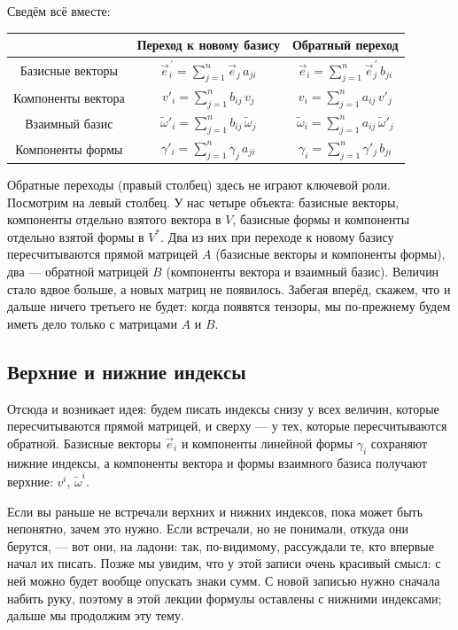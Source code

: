 \documentclass[11pt,a4paper]{article}
\begin{document}
Сведём всё вместе:

\begin{center}
\begin{tabular}{|c|c|c|}
\hline
 & Переход к новому базису & Обратный переход \\ \hline
Базисные векторы & $\vec e^{\,\prime}_i = \sum_{j=1}^n \vec e_j\, a_{ji}$ & $\vec e_i = \sum_{j=1}^n \vec e^{\,\prime}_j\, b_{ji}$ \\ \hline
Компоненты вектора & $v'_i = \sum_{j=1}^n b_{ij}\, v_j$ & $v_i = \sum_{j=1}^n a_{ij}\, v'_j$ \\ \hline
Взаимный базис & $\tilde\omega'_i = \sum_{j=1}^n b_{ij}\, \tilde\omega_j$ & $\tilde\omega_i = \sum_{j=1}^n a_{ij}\, \tilde\omega'_j$ \\ \hline
Компоненты формы & $\gamma'_i = \sum_{j=1}^n \gamma_j\, a_{ji}$ & $\gamma_i = \sum_{j=1}^n \gamma'_j\, b_{ji}$ \\ \hline
\end{tabular}
\end{center}

Обратные переходы (правый столбец) здесь не играют ключевой роли. Посмотрим на левый столбец. У нас четыре объекта: базисные векторы, компоненты отдельно взятого вектора в $V$, базисные формы и компоненты отдельно взятой формы в $V^*$. Два из них при переходе к новому базису пересчитываются прямой матрицей $A$ (базисные векторы и компоненты формы), два — обратной матрицей $B$ (компоненты вектора и взаимный базис). Величин стало вдвое больше, а новых матриц не появилось. Забегая вперёд, скажем, что и дальше ничего третьего не будет: когда появятся тензоры, мы по-прежнему будем иметь дело только с матрицами $A$ и $B$.

\subsection{Верхние и нижние индексы}

Отсюда и возникает идея: будем писать индексы снизу у всех величин, которые пересчитываются прямой матрицей, и сверху — у тех, которые пересчитываются обратной. Базисные векторы $\vec e_i$ и компоненты линейной формы $\gamma_i$ сохраняют нижние индексы, а компоненты вектора и формы взаимного базиса получают верхние: $v^i$, $\tilde\omega^i$.

Если вы раньше не встречали верхних и нижних индексов, пока может быть непонятно, зачем это нужно. Если встречали, но не понимали, откуда они берутся, — вот они, на ладони: так, по-видимому, рассуждали те, кто впервые начал их писать. Позже мы увидим, что у этой записи очень красивый смысл: с ней можно будет вообще опускать знаки сумм. С новой записью нужно сначала набить руку, поэтому в этой лекции формулы оставлены с нижними индексами; дальше мы продолжим эту тему.
\end{document}
